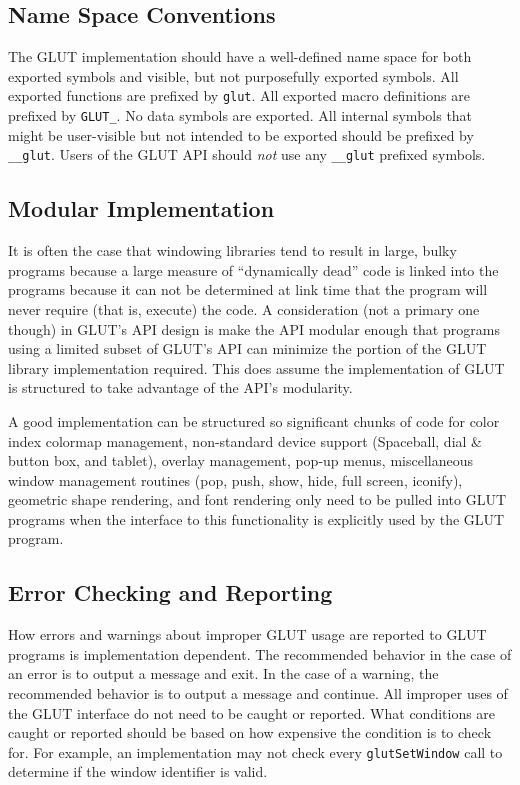 \documentclass[titlepage,twoside]{article}
\begin{document}
\subsection{Name Space Conventions}

The GLUT implementation should have a well-defined name space for both
exported symbols and visible, but not purposefully exported symbols.
All exported functions are prefixed by {\tt glut}.  All exported macro
definitions are prefixed by {\tt GLUT\_}.  No data symbols are
exported.  All internal symbols that might be user-visible but not
intended to be exported should be prefixed by {\tt \_\_glut}.  Users of
the GLUT API should {\em not} use any {\tt \_\_glut} prefixed symbols.

\subsection{Modular Implementation}

It is often the case that windowing libraries tend to result in large,
bulky programs because a large measure of ``dynamically dead'' code is
linked into the programs because it can not be determined at link time
that the program will never require (that is, execute) the code.  A
consideration (not a primary one though) in GLUT's API design is make
the API modular enough that programs using a limited subset of GLUT's
API can minimize the portion of the GLUT library implementation
required.  This does assume the implementation of GLUT is structured to
take advantage of the API's modularity.

A good implementation can be structured so significant chunks of code
for color index colormap management, non-standard device support (Spaceball,
dial \& button box, and tablet), overlay management, pop-up
menus, miscellaneous window management routines (pop, push, show, hide,
full screen, iconify), geometric shape rendering, and font rendering
only need to be pulled into GLUT programs when the interface to this
functionality is explicitly used by the GLUT program.

\subsection{Error Checking and Reporting}

How errors and warnings about improper GLUT usage are reported to GLUT
programs is implementation dependent.  The recommended behavior in the
case of an error is to output a message and exit.  In the case of a
warning, the recommended behavior is to output a message and continue.
All improper uses of the GLUT interface do not need to be caught or
reported.  What conditions are caught or reported should be based on
how expensive the condition is to check for.  For example, an
implementation may not check every {\tt glutSetWindow} call to determine
if the window identifier is valid.
\end{document}
